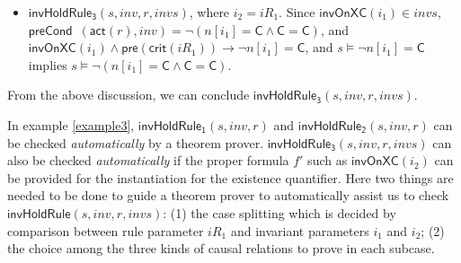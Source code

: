 \documentclass[final]{IEEEtran}
\def \eqc {=}
\def \andc {\wedge }
\def \negc {\lnot}
\begin{document}
{\begin{example}
\begin{itemize}
\item   $\mathsf{invHoldRule_3 }(s,inv,r,invs)$, where $i_2 = iR_1$.  Since
 $\mathsf{invOnXC}( i_1) \in invs$, $\mathsf{preCond}$\ $(\mathsf{act}(r),inv)=\negc (n[i_1]\eqc\mathsf{C}\andc \mathsf{C}\eqc\mathsf{C})$, and $\mathsf{invOnXC}( i_1) \andc \mathsf{pre}(\mathsf{crit}(iR_1)) \longrightarrow \negc n[i_1]\eqc\mathsf{C} $, and $s \models \neg n[i_1]\eqc\mathsf{C}$  implies  $s \models \negc ( n[i_1]\eqc\mathsf{C}\andc \mathsf{C}\eqc\mathsf{C})$. %
 \end{itemize}
 
 From the above discussion, we can conclude $\mathsf{invHoldRule_3 }(s,inv,r,invs)$.
\end{example}

In example \ref{example3},  $\mathsf{invHoldRule_1 }(s,inv,r)$ and   $\mathsf{invHoldRule_2 }(s,inv,r)$ can be checked \emph{automatically} by a theorem prover. $\mathsf{invHoldRule_3 }(s,inv,r,invs)$ can also be checked \emph{automatically}  if the proper formula $f'$ such as $\mathsf{invOnXC}( i_2) $ can be provided for the instantiation for the existence quantifier. Here two things are needed to be done to guide a theorem prover to automatically assist us to check  $\mathsf{invHoldRule }(s,inv,r,invs)$: (1) the case splitting which is decided by comparison between rule parameter $iR_1$ and invariant parameters $i_1$ and $i_2$; (2) the choice among the three kinds of causal relations to prove in each subcase.

}
\end{document}
